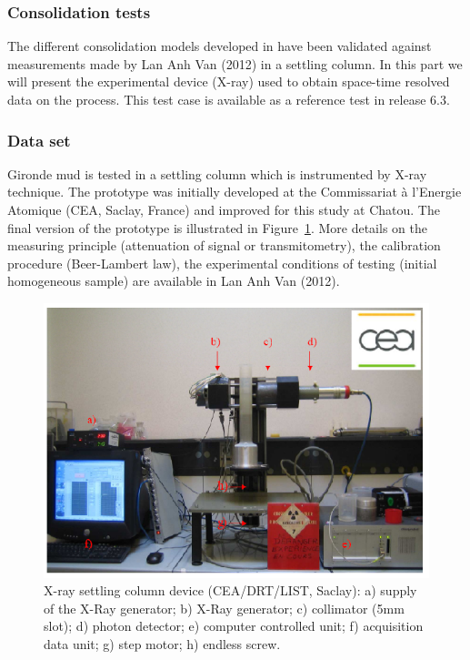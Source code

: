 \newpage

\subsubsection{Consolidation tests}
The different consolidation models developed in \sisyphe have been validated
against measurements made by Lan Anh Van (2012) in a settling column. In
this part we will present the experimental device (X-ray) used to obtain
space-time resolved data on the process. This test case is available as a
reference test in release 6.3.

\subsubsection*{Data set}
Gironde mud is tested in a settling column which is instrumented by X-ray
technique. The prototype was initially developed at the Commissariat \`{a}
l'Energie Atomique (CEA, Saclay, France) and improved for this study at
Chatou. The final version of the prototype is illustrated in Figure~\ref{fig:7}. More
details on the measuring principle (attenuation of signal or
transmitometry), the calibration procedure (Beer-Lambert law), the
experimental conditions of testing (initial homogeneous sample) are
available in Lan Anh Van (2012).

\begin{figure}[H]
\begin{center}
\includegraphics[scale=0.55,angle=0]{graphics/fig7.png}
\caption{X-ray settling column device (CEA/DRT/LIST, Saclay): a) supply of the X-Ray generator; b) X-Ray generator; 
c) collimator (5mm slot); d) photon detector; e) computer controlled unit; f) acquisition
data unit; g) step motor; h) endless screw.}\label{fig:7}
\end{center}
\end{figure}


